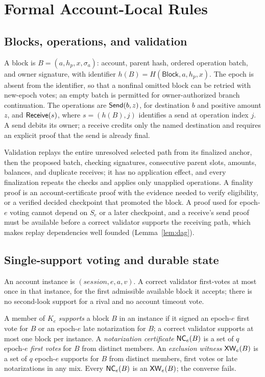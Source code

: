 \section{Formal Account-Local Rules}
\label{sec:account}
\subsection{Blocks, operations, and validation}
A block is $B=(a,h_p,x,\sigma_a)$: account, parent hash, ordered operation batch, and owner signature, with identifier $h(B)=H(\mathsf{Block},a,h_p,x)$. The epoch is absent from the identifier, so that a nonfinal omitted block can be retried with new-epoch votes; an empty batch is permitted for owner-authorized branch continuation. The operations are $\mathsf{Send}(b,z)$, for destination $b$ and positive amount $z$, and $\mathsf{Receive}(s)$, where $s=(h(B),j)$ identifies a send at operation index $j$. A send debits its owner; a receive credits only the named destination and requires an explicit proof that the send is already final.

Validation replays the entire unresolved selected path from its finalized anchor, then the proposed batch, checking signatures, consecutive parent slots, amounts, balances, and duplicate receives; it has no application effect, and every finalization repeats the checks and applies only unapplied operations. A finality proof is an account-certificate proof with the evidence needed to verify eligibility, or a verified decided checkpoint that promoted the block. A proof used for epoch-$e$ voting cannot depend on $S_e$ or a later checkpoint, and a receive's send proof must be available before a correct validator supports the receiving path, which makes replay dependencies well founded (Lemma~\ref{lem:dag}).

\subsection{Single-support voting and durable state}
\label{sec:voting}
An account instance is $(\mathit{session},e,a,v)$. A correct validator first-votes at most once in that instance, for the first admissible available block it accepts; there is no second-look support for a rival and no account timeout vote.

\begin{definition}
\label{def:support}
A member of $K_e$ \emph{supports} a block $B$ in an instance if it signed an epoch-$e$ first vote for $B$ or an epoch-$e$ late notarization for $B$; a correct validator supports at most one block per instance. A \emph{notarization certificate} $\mathsf{NC}_e(B)$ is a set of $q$ epoch-$e$ \emph{first votes} for $B$ from distinct members. An \emph{exclusion witness} $\mathsf{XW}_e(B)$ is a set of $q$ epoch-$e$ supports for $B$ from distinct members, first votes or late notarizations in any mix. Every $\mathsf{NC}_e(B)$ is an $\mathsf{XW}_e(B)$; the converse fails.
\end{definition}

